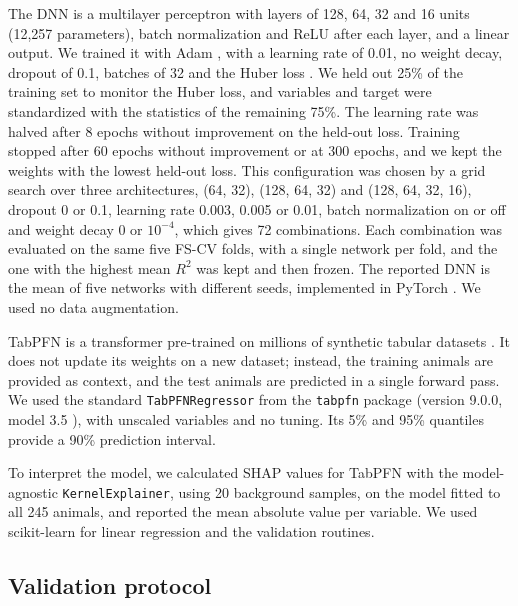 \documentclass[12pt]{article}
\begin{document}
The DNN is a multilayer perceptron with layers of 128, 64, 32 and 16 units (12,257 parameters), batch normalization \cite{ioffe2015batchnorm} and ReLU after each layer, and a linear output. We trained it with Adam \cite{kingma2015adam}, with a learning rate of 0.01, no weight decay, dropout of 0.1, batches of 32 and the Huber loss \cite{huber1964robust}. We held out 25\% of the training set to monitor the Huber loss, and variables and target were standardized with the statistics of the remaining 75\%. The learning rate was halved after 8 epochs without improvement on the held-out loss. Training stopped after 60 epochs without improvement or at 300 epochs, and we kept the weights with the lowest held-out loss. This configuration was chosen by a grid search over three architectures, (64, 32), (128, 64, 32) and (128, 64, 32, 16), dropout 0 or 0.1, learning rate 0.003, 0.005 or 0.01, batch normalization on or off and weight decay 0 or $10^{-4}$, which gives 72 combinations. Each combination was evaluated on the same five FS-CV folds, with a single network per fold, and the one with the highest mean $R^2$ was kept and then frozen. The reported DNN is the mean of five networks with different seeds, implemented in PyTorch \cite{pytorch2026}. We used no data augmentation.

TabPFN is a transformer pre-trained on millions of synthetic tabular datasets \cite{hollmann2025tabpfn}. It does not update its weights on a new dataset; instead, the training animals are provided as context, and the test animals are predicted in a single forward pass. We used the standard \texttt{TabPFNRegressor} from the \texttt{tabpfn} package (version 9.0.0, model 3.5 \cite{jager2026tabpfn35}), with unscaled variables and no tuning. Its 5\% and 95\% quantiles provide a 90\% prediction interval.

To interpret the model, we calculated SHAP values \cite{lundberg2017shap} for TabPFN with the model-agnostic \texttt{KernelExplainer}, using 20 background samples, on the model fitted to all 245 animals, and reported the mean absolute value per variable. We used scikit-learn \cite{pedregosa2011sklearn} for linear regression and the validation routines.

\subsection{Validation protocol}\label{sec:val}
\end{document}
